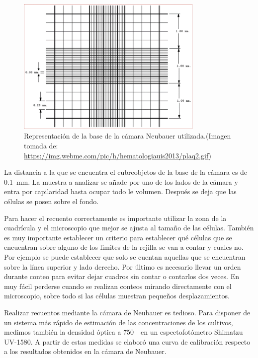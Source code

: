 \begin{figure}[H]
    \begin{center}
         \includegraphics[width=0.8\textwidth]{3_metodologia/plaq2.png}
    \caption{\small Representación de la base de la cámara Neubauer utilizada.(Imagen tomada de: \url{https://img.webme.com/pic/h/hematologiauis2013/plaq2.gif})}
    \label{fig:camara_neubauer}
    \end{center}
\end{figure}

La distancia a la que se encuentra el cubreobjetos de la base de la cámara es de 0.1~mm. La muestra a analizar se añade por uno de los lados de la cámara y entra por capilaridad hasta ocupar todo le volumen. Después se deja que las células se posen sobre el fondo.

Para hacer el recuento correctamente es importante utilizar la zona de la cuadrícula y el microscopio que mejor se ajusta al tamaño de las células. También es muy importante establecer un criterio para establecer qué células que se encuentran sobre alguno de los limites de la rejilla se van a contar y cuales no. Por ejemplo se puede establecer que solo se cuentan aquellas que se encuentran sobre la línea superior y lado derecho. Por último es necesario llevar un orden durante conteo para evitar dejar cuadros sin contar o contarlos dos veces. En muy fácil perderse cuando se realizan conteos mirando directamente con el microscopio, sobre todo si las células muestran pequeños desplazamientos.

Realizar recuentos mediante la cámara de Neubauer es tedioso. Para disponer de un sistema más rápido de estimación de las concentraciones de los cultivos, medimos también la densidad óptica a 750~\micrometro\ en un espectofotómetro Shimatzu UV-1580. A partir de estas medidas se elaboró una curva de calibración respecto a los resultados obtenidos en la cámara de Neubauer.

